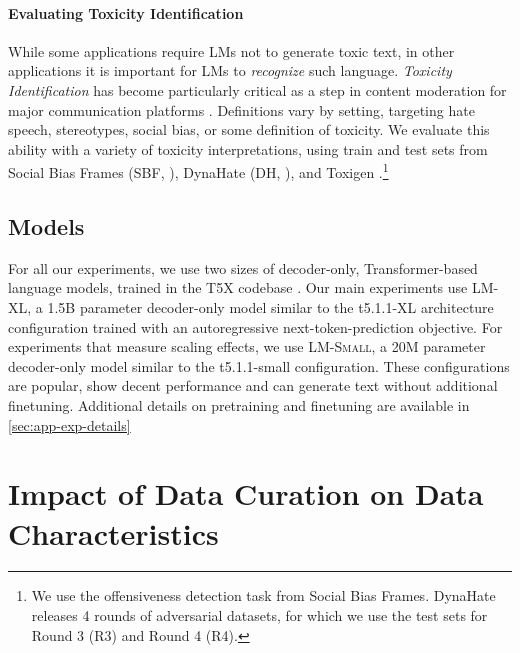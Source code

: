 \documentclass{article}
\newcommand{\smalLM}[0]{\textsc{LM-Small}}
\newcommand{\bigLM}[0]{\textsc{LM-XL}}
\begin{document}
\vspace{-3mm}
\paragraph{Evaluating Toxicity Identification}
\label{sec:eval-tox-identification}
While some applications require LMs not to generate toxic text, in other applications it is important for LMs to \textit{recognize} such language.
\emph{Toxicity Identification} has become particularly critical as a step in content moderation for major communication platforms \citep{nyt2020moderation, newamerica2019moderation}.
Definitions vary by setting, targeting hate speech, stereotypes, social bias, or some definition of toxicity.
We evaluate this ability with a variety of toxicity interpretations, using train and test sets from Social Bias Frames (SBF, \citealp{sap-etal-2020-social}), DynaHate (DH, \citealp{vidgen-etal-2021-learning}), and Toxigen \citep{hartvigsen2022toxigen}.\footnote{We use the offensiveness detection task from Social Bias Frames. DynaHate releases 4 rounds of adversarial datasets, for which we use the test sets for Round 3 (R3) and Round 4 (R4).}

\vspace{-3mm}
\subsection{Models}

For all our experiments, we use two sizes of decoder-only, Transformer-based language models, trained in the T5X codebase \citep{roberts2022t5x}.
Our main experiments use \bigLM, a 1.5B parameter decoder-only model similar to the t5.1.1-XL architecture configuration  trained with an autoregressive next-token-prediction objective.
For experiments that measure scaling effects, we use \smalLM, a 20M parameter decoder-only model similar to the t5.1.1-small configuration.
These configurations are popular, show  decent performance \citep{wang2022language} and can generate text without additional finetuning.
Additional details on pretraining and finetuning are available in \cref{sec:app-exp-details}

\vspace{-3mm}
\section{Impact of Data Curation on Data Characteristics}
\label{sec:data-analysis}
\end{document}
